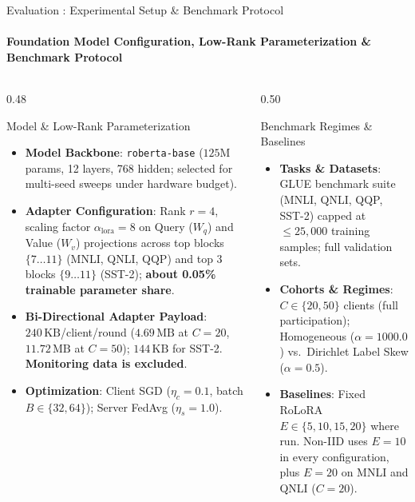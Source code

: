 \documentclass[aspectratio=169]{beamer}
\begin{document}
\begin{frame}[label=main_impl]{Evaluation : Experimental Setup \& Benchmark Protocol}
    \framesubtitle{Foundation Model Configuration, Low-Rank Parameterization \& Benchmark Protocol \hfill \hyperlink{backup_algo}{} \; \hyperlink{backup_testbed}{}}
    \scriptsize
    \begin{columns}[t]
        \begin{column}{0.48\textwidth}
            \begin{block}{Model \& Low-Rank Parameterization}
                \begin{itemize}
                    \item \textbf{Model Backbone}: \texttt{roberta-base} ($125\text{M}$ params, 12 layers, 768 hidden; selected for multi-seed sweeps under hardware budget).
                    \item \textbf{Adapter Configuration}: Rank $r=4$, scaling factor $\alpha_{\text{lora}}=8$ on Query ($W_q$) and Value ($W_v$) projections across top blocks $\{7\dots 11\}$ (MNLI, QNLI, QQP) and top 3 blocks $\{9\dots 11\}$ (SST-2); \textbf{about 0.05\% trainable parameter share}.
                    \item \textbf{Bi-Directional Adapter Payload}: $240\,\text{KB}$/client/round ($4.69\,\text{MB}$ at $C=20$, $11.72\,\text{MB}$ at $C=50$); $144\,\text{KB}$ for SST-2. \textbf{Monitoring data is excluded}.
                    \item \textbf{Optimization}: Client SGD ($\eta_c = 0.1$, batch $B \in \{32, 64\}$); Server FedAvg ($\eta_s = 1.0$).
                \end{itemize}
            \end{block}
        \end{column}
        \begin{column}{0.50\textwidth}
            \begin{block}{Benchmark Regimes \& Baselines}
                \begin{itemize}
                    \item \textbf{Tasks \& Datasets}: GLUE benchmark suite (MNLI, QNLI, QQP, SST-2) capped at $\le 25{,}000$ training samples; full validation sets.
                    \item \textbf{Cohorts \& Regimes}: $C \in \{20, 50\}$ clients (full participation); Homogeneous ($\alpha=1000.0$) vs.\ Dirichlet Label Skew ($\alpha=0.5$).
                    \item \textbf{Baselines}: Fixed RoLoRA $E \in \{5, 10, 15, 20\}$ where run. Non-IID uses $E = 10$ in every configuration, plus $E = 20$ on MNLI and QNLI ($C = 20$).

\end{itemize}
\end{block}
\end{column}
\end{columns}
\end{frame}
\end{document}
